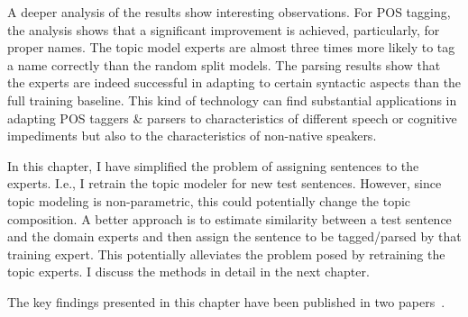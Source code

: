 A deeper analysis of the results show interesting observations. For POS tagging, the analysis shows that a significant improvement is achieved, particularly, for proper names. The topic model experts are almost three times more likely to tag a name correctly than the random split models. The parsing results show that the experts are indeed successful in adapting to certain syntactic aspects than the full training baseline. This kind of technology can find substantial applications in adapting POS taggers \& parsers to characteristics of different speech or cognitive impediments but also to the characteristics of non-native speakers. 

In this chapter, I have simplified the problem of assigning sentences to the experts. I.e., I retrain the topic modeler for new test sentences. However, since topic modeling is non-parametric, this could potentially change the topic composition. A better approach is to estimate similarity between a test sentence and the domain experts and then assign the sentence to be tagged/parsed by that training expert. This potentially alleviates the problem posed by retraining the topic experts. I discuss the methods in detail in the next chapter.

The key findings presented in this chapter have been published in two papers~\citep{icon-atr,eacl-atr}. 




